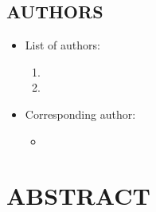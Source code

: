 \documentclass[12pt,english]{article}
\begin{document}
\subsection*{AUTHORS}
\begin{itemize}[label={}, leftmargin=*]
    \item List of authors:
    \begin{enumerate}
        \item \AUTHORHADAHINFO
        \item \AUTHORANGINFO
    \end{enumerate}
    \item Corresponding author:
    \begin{itemize}
        \item \textbf{\AUTHORHADAHINFO}
    \end{itemize}
\end{itemize}




\clearpage 

\doublespacing
\section*{ABSTRACT}
\PAPERABSTRACT
\clearpage 
\end{document}
